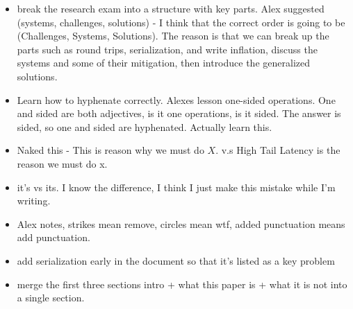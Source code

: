 \begin{itemize}
    
    \item break the research exam into a structure with key parts. Alex
    suggested (systems, challenges, solutions) - I think that the correct order
    is going to be (Challenges, Systems, Solutions). The reason is that we can
    break up the parts such as round trips, serialization, and write inflation,
    discuss the systems and some of their mitigation, then introduce the
    generalized solutions.

    \item Learn how to hyphenate correctly. Alexes lesson one-sided operations.
    One and sided are both adjectives, is it one operations, is it sided. The
    answer is sided, so one and sided are hyphenated. Actually learn this.

    \item Naked this - This is reason why we must do $X$. v.s High Tail Latency
    is the reason we must do x.

    \item it's vs its. I know the difference, I think I just make this mistake
    while I'm writing.

    \item Alex notes, strikes mean remove, circles mean wtf, added punctuation
    means add punctuation.

    \item add serialization early in the document so that it's listed as a key problem
    \item merge the first three sections intro + what this paper is + what it is not into a single section. 
    

\end{itemize}



